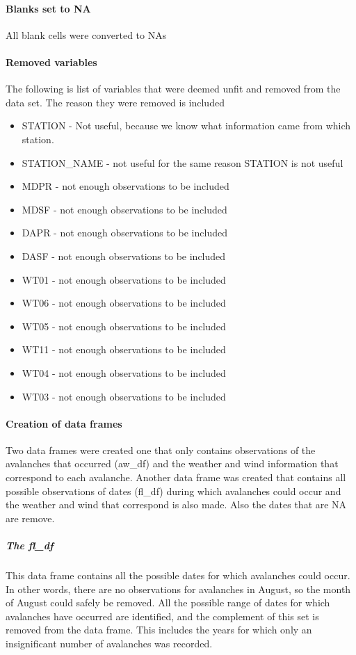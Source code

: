 \documentclass[12pt]{article}
\begin{document}
\paragraph*{Blanks set to NA}
All blank cells were converted to NAs

\paragraph*{Removed variables}
The following  is list of variables that were deemed unfit and removed from the data set.   The reason they were removed is included
\begin{itemize}
\item STATION - Not useful, because we know what information came from which station.
\item STATION\_NAME - not useful for the same reason STATION is not useful
\item MDPR - not enough observations to be included
\item MDSF - not enough observations to be included
\item DAPR - not enough observations to be included
\item DASF - not enough observations to be included
\item WT01 - not enough observations to be included
\item WT06 - not enough observations to be included
\item WT05 - not enough observations to be included
\item WT11 - not enough observations to be included
\item WT04 - not enough observations to be included
\item WT03 - not enough observations to be included
\end{itemize}

\paragraph*{Creation of data frames}
Two data frames were created one that only contains observations of the avalanches that occurred (aw\_df) and the weather and wind information that correspond to each avalanche.  Another data frame was created that contains all possible observations of dates (fl\_df) during which avalanches could occur and the weather and wind that correspond is also made.  Also the dates that are NA are remove.

\subparagraph*{The fl\_df}
This data frame contains all the possible dates for which avalanches could occur.  In other words, there are no observations for avalanches in August, so the month of August could safely be removed.  All the possible range of dates for which avalanches have occurred are identified, and the complement of this set is removed from the data frame.  This includes the years for which only an insignificant number of avalanches was recorded.
\end{document}
